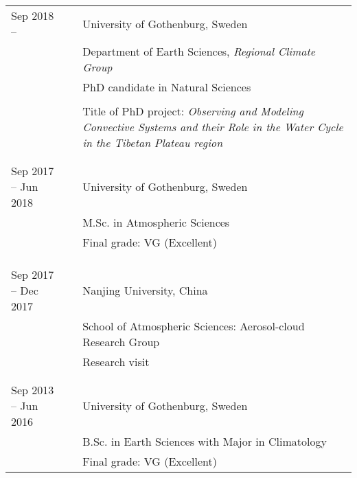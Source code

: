 \documentclass[a4paper,12pt]{article}
\begin{document}
\begin{titlepage}
\begin{table}[h!]
	\begin{tabular}{p{3.7cm}p{0.5cm}|p{12cm}}
    Sep 2018 -- & & University of Gothenburg, Sweden \\
      & & Department of Earth Sciences, \textit{Regional Climate Group} \\
  & & PhD candidate in Natural Sciences \\
   && \\
    & & Title of PhD project: \textit{Observing and Modeling Convective Systems and their Role in the Water Cycle in the Tibetan Plateau region}\\
	& & \\[-1.7ex]
    &&\\ 
  Sep 2017 -- Jun 2018 & & University of Gothenburg, Sweden \\
  & & M.Sc. in Atmospheric Sciences\\
  &&Final grade: VG (Excellent)\\
  && \\
	& & \\[-1.7ex]
    &&\\
  Sep 2017 -- Dec 2017 && Nanjing University, China \\
  && School of Atmospheric Sciences: Aerosol-cloud Research Group  \\
  && Research visit\\
  &&\\
	& & \\[-1.7ex]
	Sep 2013 -- Jun 2016 & & University of Gothenburg, Sweden\\
	& & B.Sc. in Earth Sciences with Major in Climatology\\
  &&Final grade: VG (Excellent)\\
	\end{tabular}
\end{table}
\newpage




\end{titlepage}
\end{document}
